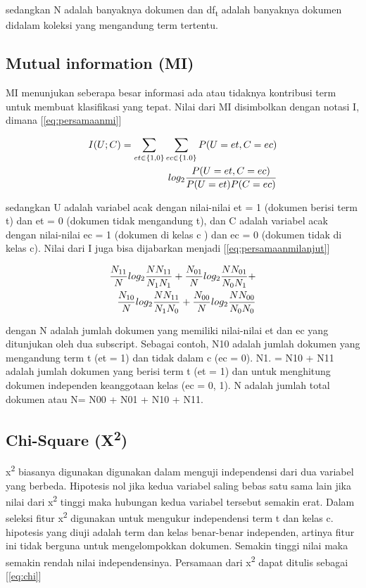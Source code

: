 sedangkan N adalah banyaknya dokumen dan df\textsubscript{t} adalah banyaknya dokumen didalam koleksi yang mengandung term tertentu.

\subsection*{Mutual information (MI)}

MI menunjukan seberapa besar informasi ada atau tidaknya kontribusi term untuk membuat klasifikasi yang tepat. Nilai dari MI disimbolkan dengan notasi I, dimana [\ref{eq:persamaanmi}]

\begin{equation}
\begin{split}
\tiny
I(U;C) = \sum\limits_{et\in\{1,0\}}\sum\limits_{ec\in\{1.0\}} P(U = et, C = ec) \\
log_2 \frac{P(U = et,C =ec)}{P(U = et)P(C = ec)} 
\label{eq:persamaanmi}
\normalsize
\end{split}
\end{equation}

sedangkan U adalah variabel acak dengan nilai-nilai et = 1 (dokumen berisi term t) dan et = 0 (dokumen tidak mengandung t), dan C adalah variabel acak dengan nilai-nilai ec = 1 (dokumen di kelas c ) dan ec = 0 (dokumen tidak di kelas c). Nilai dari I juga bisa dijabarkan menjadi [\ref{eq:persamaanmilanjut}]

\begin{equation}
\begin{split}
\tiny
\frac{N_{11}}{N}log_2\frac{NN_{11}}{N_1N_1} + \frac{N_{01}}{N}log_2\frac{NN_{01}}{N_0N_1} + \\
\frac{N_{10}}{N}log_2\frac{NN_{11}}{N_1N_0} + \frac{N_{00}}{N}log_2\frac{NN_{00}}{N_0N_0}
\label{eq:persamaanmilanjut}
\normalsize
\end{split}
\end{equation}


dengan N adalah jumlah dokumen yang memiliki nilai-nilai et dan ec yang ditunjukan oleh dua subscript. Sebagai contoh, N10 adalah jumlah dokumen yang mengandung term t (et = 1) dan tidak dalam c (ec = 0). N1. = N10 + N11 adalah jumlah dokumen yang berisi term t (et = 1) dan untuk menghitung dokumen independen keanggotaan kelas (ec = {0, 1}). N adalah jumlah total dokumen atau N= N00 + N01 + N10 + N11.

\subsection*{Chi-Square (X\textsuperscript{2})}
x\textsuperscript{2} biasanya digunakan digunakan dalam menguji independensi dari dua variabel  yang berbeda. Hipotesis nol jika kedua variabel saling bebas satu sama lain jika nilai dari x\textsuperscript{2} tinggi maka hubungan kedua variabel tersebut semakin erat. Dalam seleksi fitur x\textsuperscript{2} digunakan untuk mengukur independensi term t dan kelas c. hipotesis yang diuji adalah term dan kelas benar-benar independen, artinya fitur ini tidak berguna untuk mengelompokkan dokumen. Semakin tinggi nilai maka semakin rendah nilai independensinya. Persamaan dari x\textsuperscript{2}  dapat ditulis sebagai [\ref{eq:chi}]

